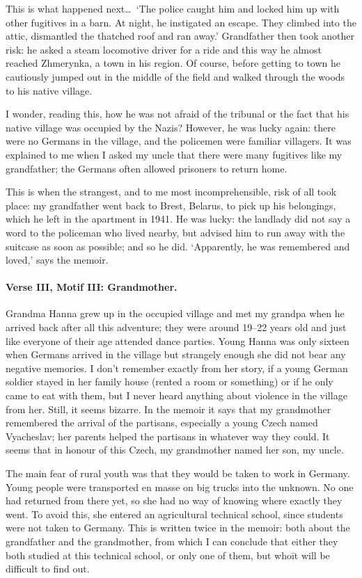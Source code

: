 This is what happened next\ldots\ `The police caught him and locked
him up with other fugitives in a barn. At night, he instigated an
escape. They climbed into the attic, dismantled the thatched roof and
ran away.' Grandfather then took another risk: he asked a steam
locomotive driver for a ride and this way he almost reached Zhmerynka,
a town in his region. Of course, before getting to town he cautiously
jumped out in the middle of the field and walked through the woods to
his native village.

I wonder, reading this, how he was not afraid of the tribunal or the
fact that his native village was occupied by the Nazis? However, he
was lucky again: there were no Germans in the village, and the
policemen were familiar villagers. It was explained to me when I asked
my uncle that there were many fugitives like my grandfather; the
Germans often allowed prisoners to return home.

This is when the strangest, and to me most incomprehensible, risk of all
took place: my grandfather went back to Brest, Belarus, to pick up his
belongings, which he left in the apartment in 1941. He was lucky: the
landlady did not say a word to the policeman who lived nearby, but
advised him to run away with the suitcase as soon as possible; and so
he did. `Apparently, he was remembered and loved,' says the memoir.

\paragraph{Verse III, Motif III: Grandmother.}\strut

Grandma Hanna grew up in the occupied village and met my grandpa when
he arrived back after all this adventure; they were around 19--22 years
old and just like everyone of their age attended dance parties. Young
Hanna was only sixteen when Germans arrived in the village but
strangely enough she did not bear any negative memories. I don't
remember exactly from her story, if a young German soldier stayed in
her family house (rented a room or something) or if he only came to
eat with them, but I never heard anything about violence in
the village from her. Still, it seems bizarre. In the memoir it says that my
grandmother remembered the arrival of the partisans, especially a
young Czech named Vyacheslav; her parents helped the partisans in
whatever way they could. It seems that in honour of this Czech, my
grandmother named her son, my uncle.

The main fear of rural youth was that they would be taken to work in
Germany. Young people were transported en masse on big trucks into the
unknown. No one had returned from there yet, so she had no way of
knowing where exactly they went. To avoid this, she entered an
agricultural technical school, since students were not taken to
Germany. This is written twice in the memoir: both about the
grandfather and the grandmother, from which I can conclude that either
they both studied at this technical school, or only one of them, but
who\=it will be difficult to find out.

